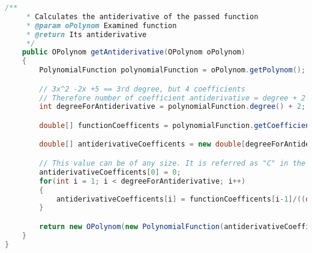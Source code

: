 \begin{lstlisting}[caption=Integral (Istogu),label=list:Integral,language=Java]
    /**
     * Calculates the antiderivative of the passed function
     * @param oPolynom Examined function
     * @return Its antiderivative
     */
    public OPolynom getAntiderivative(OPolynom oPolynom)
    {
        PolynomialFunction polynomialFunction = oPolynom.getPolynom();

        // 3x^2 -2x +5 == 3rd degree, but 4 coefficients
        // Therefore number of coefficient antiderivative = degree + 2
        int degreeForAntiderivative = polynomialFunction.degree() + 2;

        double[] functionCoefficents = polynomialFunction.getCoefficients();

        double[] antiderivativeCoefficents = new double[degreeForAntiderivative];

        // This value can be of any size. It is referred as "C" in the literature.
        antiderivativeCoefficents[0] = 0;
        for(int i = 1; i < degreeForAntiderivative; i++)
        {
            antiderivativeCoefficents[i] = functionCoefficents[i-1]/((double) i);
        }

        return new OPolynom(new PolynomialFunction(antiderivativeCoefficents));
    }
}
\end{lstlisting}    

